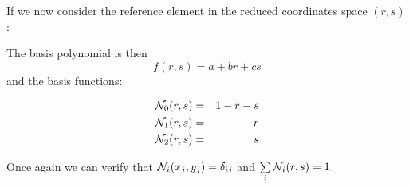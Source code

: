 \noindent If we now consider the reference element in the reduced coordinates space $(r,s)$:



The basis polynomial is then
\[
f(r,s) = a + br + cs 
\]
and the basis functions:
\begin{mdframed}[backgroundcolor=blue!5]
\begin{eqnarray}
{\mathcal{N}}_0(r,s) &=& 1-r-s \\
{\mathcal{N}}_1(r,s) &=& r \\
{\mathcal{N}}_2(r,s) &=& s 
\end{eqnarray}
\end{mdframed}
Once again we can verify that ${\mathcal{N}}_i(x_j,y_j)=\delta_{ij}$ and $\sum\limits_i {\mathcal{N}}_i(r,s)=1$.



